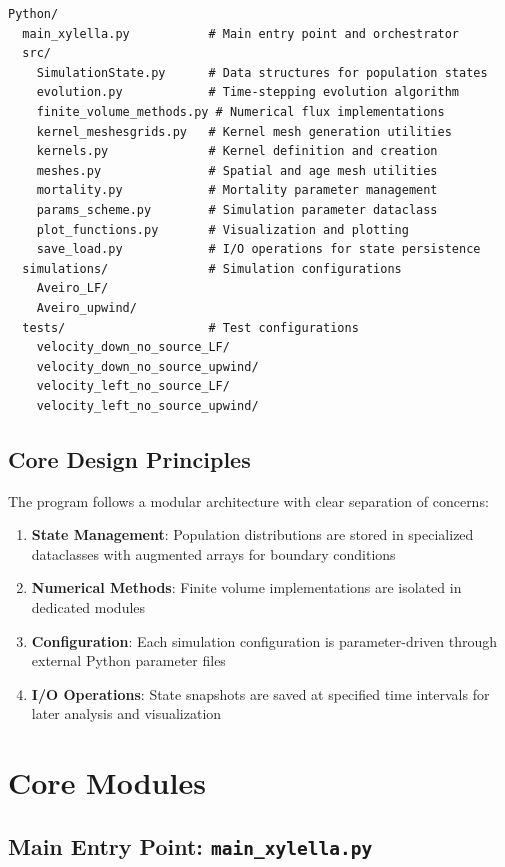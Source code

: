 \documentclass[12pt,a4paper]{report}
\begin{document}
\begin{lstlisting}
Python/
  main_xylella.py           # Main entry point and orchestrator
  src/
    SimulationState.py      # Data structures for population states
    evolution.py            # Time-stepping evolution algorithm
    finite_volume_methods.py # Numerical flux implementations
    kernel_meshesgrids.py   # Kernel mesh generation utilities
    kernels.py              # Kernel definition and creation
    meshes.py               # Spatial and age mesh utilities
    mortality.py            # Mortality parameter management
    params_scheme.py        # Simulation parameter dataclass
    plot_functions.py       # Visualization and plotting
    save_load.py            # I/O operations for state persistence
  simulations/              # Simulation configurations
    Aveiro_LF/
    Aveiro_upwind/
  tests/                    # Test configurations
    velocity_down_no_source_LF/
    velocity_down_no_source_upwind/
    velocity_left_no_source_LF/
    velocity_left_no_source_upwind/
\end{lstlisting}

\section{Core Design Principles}

The program follows a modular architecture with clear separation of concerns:

\begin{enumerate}
    \item \textbf{State Management}: Population distributions are stored in specialized dataclasses with augmented arrays for boundary conditions
    \item \textbf{Numerical Methods}: Finite volume implementations are isolated in dedicated modules
    \item \textbf{Configuration}: Each simulation configuration is parameter-driven through external Python parameter files
    \item \textbf{I/O Operations}: State snapshots are saved at specified time intervals for later analysis and visualization
\end{enumerate}

\chapter{Core Modules}

\section{Main Entry Point: \texttt{main\_xylella.py}}
\end{document}
